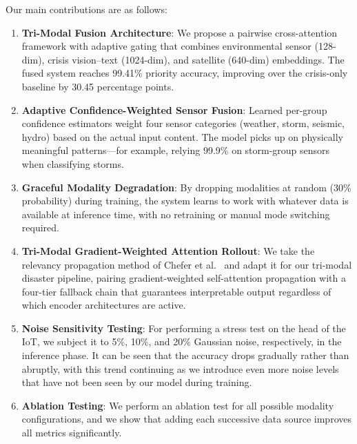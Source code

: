 \documentclass[journal]{IEEEtran}
\begin{document}
Our main contributions are as follows:

\begin{enumerate}
    \item \textbf{Tri-Modal Fusion Architecture}: We propose a pairwise cross-attention framework with adaptive gating that combines environmental sensor (128-dim), crisis vision--text (1024-dim), and satellite (640-dim) embeddings. The fused system reaches 99.41\% priority accuracy, improving over the crisis-only baseline by 30.45 percentage points.

    \item \textbf{Adaptive Confidence-Weighted Sensor Fusion}: Learned per-group confidence estimators weight four sensor categories (weather, storm, seismic, hydro) based on the actual input content. The model picks up on physically meaningful patterns---for example, relying 99.9\% on storm-group sensors when classifying storms.

    \item \textbf{Graceful Modality Degradation}: By dropping modalities at random (30\% probability) during training, the system learns to work with whatever data is available at inference time, with no retraining or manual mode switching required.

    \item \textbf{Tri-Modal Gradient-Weighted Attention Rollout}: We take the relevancy propagation method of Chefer et al.~\cite{chefer2021transformer} and adapt it for our tri-modal disaster pipeline, pairing gradient-weighted self-attention propagation with a four-tier fallback chain that guarantees interpretable output regardless of which encoder architectures are active.

    \item \textbf{Noise Sensitivity Testing}: For performing a stress test on the head of the IoT, we subject it to 5\%, 10\%, and 20\% Gaussian noise, respectively, in the inference phase. It can be seen that the accuracy drops gradually rather than abruptly, with this trend continuing as we introduce even more noise levels that have not been seen by our model during training.
 
    \item \textbf{Ablation Testing}: We perform an ablation test for all possible modality configurations, and we show that adding each successive data source improves all metrics significantly.
\end{enumerate}

\end{document}
